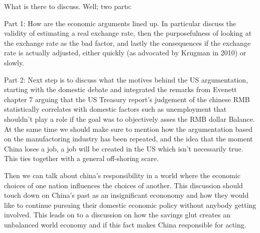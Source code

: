 What is there to discuss. Well; two parts:

Part 1: How are the economic arguments lined up. In particular discuss 
the validity of estimating a real exchange rate, then the purposefulness 
of looking at the exchange rate as the bad factor, and lastly the 
consequences if the exchange rate is actually adjusted, either quickly 
(as advocated by Krugman in 2010) or slowly.

Part 2: Next step is to discuss what the motives behind the US 
argumentation, starting with the domestic debate and integrated the 
remarks from Evenett chapter 7 arguing that the US Treasury report's 
judgement of the chinese RMB statistically correlates with domestic 
factors such as unemployment that shouldn't play a role if the goal was 
to objectively asses the RMB dollar Balance. At the same time we should 
make sure to mention how the argumentation based on the manufactoring 
industry has been repeated, and the idea that the moment China loses a 
job, a job will be created in the US which isn't necessarily true. This 
ties together with a general off-shoring scare.

Then we can talk about china's responsibility in a world where the 
economic choices of one nation influences the choices of another. This 
discussion should touch down on China's past as an insignificant 
econonomy and how they would like to continue pursuing their domestic 
economic policy without anybody getting involved. This leads on to a 
discussion on how the savings glut creates an unbalanced world economy 
and if this fact makes China responsible for acting.
